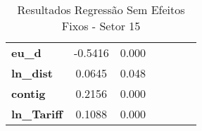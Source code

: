 \begin{table}
\begin{center}
\begin{tabular}{lcccccc}
\textbf{eu\_d}                                                     &      -0.5416  &         0.000       \\
\textbf{ln\_dist}                                                  &       0.0645  &         0.048       \\
\textbf{contig}                                                    &       0.2156  &         0.000       \\
\textbf{ln\_Tariff}                                                &       0.1088  &         0.000       \\
\bottomrule
\end{tabular}
\caption{ Resultados Regressão Sem Efeitos Fixos - Setor 15}
\end{center}
\end{table}